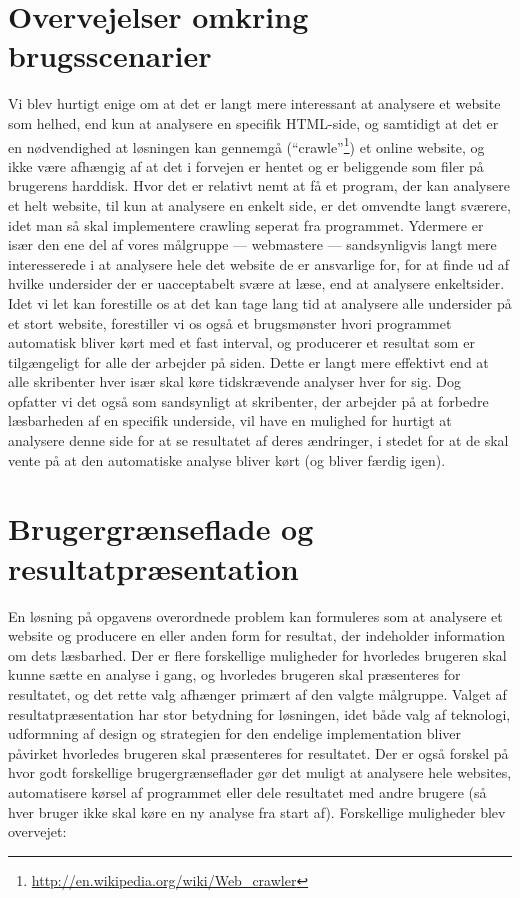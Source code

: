 \documentclass[a4paper,oneside,article]{memoir}
\begin{document}
\section{Overvejelser omkring brugsscenarier}
\label{brugsovervejelser}
Vi blev hurtigt enige om at det er langt mere interessant at analysere
et website som helhed, end kun at analysere en specifik HTML-side, og
samtidigt at det er en nødvendighed at løsningen kan gennemgå
(``crawle''\footnote{\url{http://en.wikipedia.org/wiki/Web_crawler}}) et online website, og ikke være afhængig af at det i
forvejen er hentet og er beliggende som filer på brugerens
harddisk. Hvor det er relativt nemt at få et program, der kan
analysere et helt website, til kun at analysere en enkelt side, er det
omvendte langt sværere, idet man så skal implementere crawling seperat
fra programmet. Ydermere er især den ene del af vores målgruppe ---
webmastere --- sandsynligvis langt mere interesserede i at
analysere hele det website de er ansvarlige for, for at finde ud af
hvilke undersider der er uacceptabelt svære at læse, end at analysere
enkeltsider. Idet vi let kan forestille os at det kan tage lang
tid at analysere alle undersider på et stort website, forestiller vi
os også et brugsmønster hvori programmet automatisk bliver kørt med et
fast interval, og producerer et resultat som er tilgængeligt for alle
der arbejder på siden. Dette er langt mere effektivt end at alle
skribenter hver især skal køre tidskrævende analyser hver for sig. Dog
opfatter vi det også som sandsynligt at skribenter, der arbejder på at
forbedre læsbarheden af en specifik underside, vil have en mulighed
for hurtigt at analysere denne side for at se resultatet af deres
ændringer, i stedet for at de skal vente på at den automatiske analyse
bliver kørt (og bliver færdig igen).

\section{Brugergrænseflade og resultatpræsentation}
\label{brugergraenseflade}
En løsning på opgavens overordnede problem kan formuleres som at
analysere et website og producere en eller anden form for resultat,
der indeholder information om dets læsbarhed. Der er flere forskellige
muligheder for hvorledes brugeren skal kunne sætte en analyse i gang,
og hvorledes brugeren skal præsenteres for resultatet, og det rette
valg afhænger primært af den valgte målgruppe. Valget af
resultatpræsentation har stor betydning for løsningen, idet både valg
af teknologi, udformning af design og strategien for den endelige
implementation bliver påvirket hvorledes brugeren skal præsenteres for
resultatet. Der er også forskel på hvor godt forskellige
brugergrænseflader gør det muligt at analysere hele websites,
automatisere kørsel af programmet eller dele resultatet med andre
brugere (så hver bruger ikke skal køre en ny analyse fra start
af). Forskellige muligheder blev overvejet:
\end{document}
